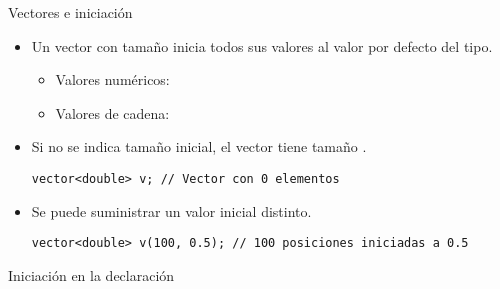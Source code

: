 \begin{frame}[t,fragile]{Vectores e iniciación}
\begin{itemize}
  \item Un vector con tamaño inicia todos sus valores al valor por defecto del tipo.
    \begin{itemize}
      \item Valores numéricos: 
      \item Valores de cadena: 
    \end{itemize}

  \vfill
  \item Si no se indica tamaño inicial, el vector tiene tamaño .
\begin{lstlisting}
vector<double> v; // Vector con 0 elementos
\end{lstlisting}

  \vfill
  \item Se puede suministrar un valor inicial distinto.
\begin{lstlisting}
vector<double> v(100, 0.5); // 100 posiciones iniciadas a 0.5
\end{lstlisting}
\end{itemize}
\end{frame}

\begin{frame}
\begin{block}{Iniciación en la declaración}

\end{block}
\end{frame}


